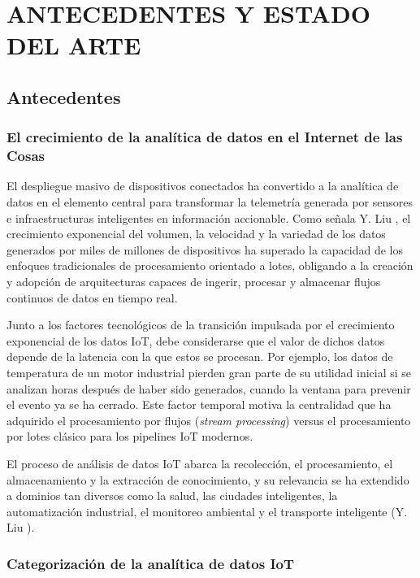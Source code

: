 \chapter{ANTECEDENTES Y ESTADO DEL \mbox{ARTE}}

\section{Antecedentes}

\subsection{El crecimiento de la analítica de datos en el Internet de las Cosas}

El despliegue masivo de dispositivos conectados ha convertido a la analítica de datos en el elemento central para transformar la telemetría generada por sensores e infraestructuras inteligentes en información accionable. Como señala Y. Liu \cite{liu2025}, el crecimiento exponencial del volumen, la velocidad y la variedad de los datos generados por miles de millones de dispositivos ha superado la capacidad de los enfoques tradicionales de procesamiento orientado a lotes, obligando a la creación y adopción de arquitecturas capaces de ingerir, procesar y almacenar flujos continuos de datos en tiempo real.

Junto a los factores tecnológicos de la transición impulsada por el crecimiento exponencial de los datos IoT, debe considerarse que el valor de dichos datos depende de la latencia con la que estos se procesan. Por ejemplo, los datos de temperatura de un motor industrial pierden gran parte de su utilidad inicial si se analizan horas después de haber sido generados, cuando la ventana para prevenir el evento ya se ha cerrado. Este factor temporal motiva la centralidad que ha adquirido el procesamiento por flujos (\textit{stream processing}) versus el procesamiento por lotes clásico para los pipelines IoT modernos.

El proceso de análisis de datos IoT abarca la recolección, el procesamiento, el almacenamiento y la extracción de conocimiento, y su relevancia se ha extendido a dominios tan diversos como la salud, las ciudades inteligentes, la automatización industrial, el monitoreo ambiental y el transporte inteligente (Y. Liu \cite{liu2025}).

\subsection{Categorización de la analítica de datos IoT}


